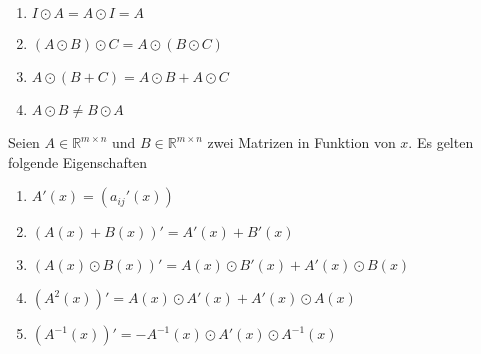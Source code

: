 \begin{enumerate}[$(i)$]
\item $I\odot A=A\odot I=A$
\item $\left(A\odot B\right)\odot C=A\odot\left(B\odot C\right)$
\item $A\odot\left(B+C\right)=A\odot B+A\odot C$
\item $A\odot B\neq B\odot A$
\end{enumerate}
Seien $A\in\mathbb{R}^{m\times n}$ und $B\in\mathbb{R}^{m\times n}$ zwei Matrizen in Funktion von $x$. Es gelten folgende Eigenschaften
\begin{enumerate}[$(i)$]
\item $A'\left(x\right)=\left(a_{ij}'\left(x\right)\right)$
\item $\left(A\left(x\right)+B\left(x\right)\right)'=A'\left(x\right)+B'\left(x\right)$
\item $\left(A\left(x\right)\odot B\left(x\right)\right)'=A\left(x\right)\odot B'\left(x\right)+A'\left(x\right)\odot B\left(x\right)$
\item $\left(A^2\left(x\right)\right)'=A\left(x\right)\odot A'\left(x\right)+A'\left(x\right)\odot A\left(x\right)$
\item $\left(A^{-1}\left(x\right)\right)'=-A^{-1}\left(x\right)\odot A'\left(x\right)\odot A^{-1}\left(x\right)$
\end{enumerate}  
